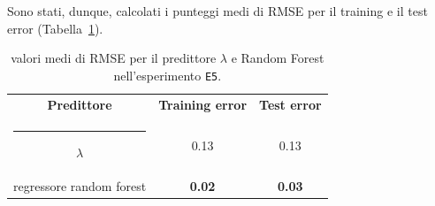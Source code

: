 \documentclass[12pt]{report}
\makeatletter
\theoremstyle{definition}
\newcommand{\thickhline}{%
    \noalign {\ifnum 0=`}\fi \hrule height 1pt
    \futurelet \reserved@a \@xhline
}
\makeatother
\begin{document}
Sono stati, dunque, calcolati i punteggi medi di RMSE per il training e il test error (Tabella~\ref{rmse_exp5}). 
\begin{table}
\centering
\begin{adjustbox}{max width=\textwidth}
 \begin{tabular}{|c|c|c|} 
 \hline
\textbf{Predittore} & \textbf{Training error} & \textbf{Test error}
\\ [0.5ex] 
 \thickhline
 $\lambda$ & 0.13 & 0.13 \\
 regressore random forest & \textbf{0.02} & \textbf{0.03}
 \\
 \hline
\end{tabular}
\end{adjustbox}
\caption{valori medi di RMSE per il predittore $\lambda$ e Random Forest nell'esperimento \texttt{E5}.}
\label{rmse_exp5}
\end{table}
\end{document}
